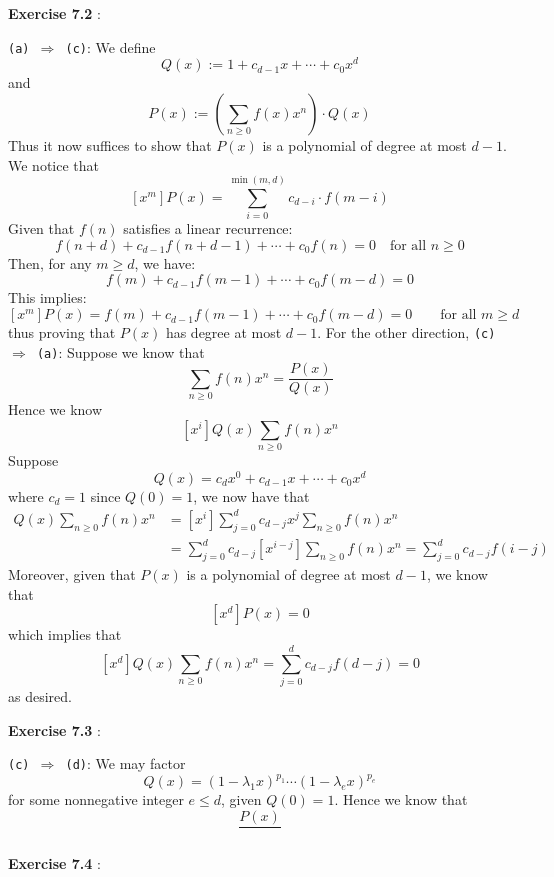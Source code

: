 \documentclass{article}
\newenvironment{solution}[1][\proofname]{
    \proof[\textbf{Solution:}] \renewcommand{\qedsymbol}{$\bell$}
}{\endproof}
\begin{document}
\newpage

\noindent \textbf{Exercise 7.2} : 

\begin{solution}
    \texttt{(a) $\Rightarrow$ (c)}: We define 
    \[ Q(x) := 1 + c_{d-1} x + \cdots + c_0 x^d \]
    and 
    \[ P(x) := \left( \sum_{n \geq 0} f(x) x^n \right) \cdot Q(x) \]
    Thus it now suffices to show that $P(x)$ is a polynomial of degree at most $d - 1$. We notice that 
    \[ [x^m] P(x) = \sum_{i = 0}^{\min(m, d)} c_{d - i} \cdot f(m - i) \]
    Given that $f(n)$ satisfies a linear recurrence:
    \[
    f(n + d) + c_{d-1} f(n + d - 1) + \cdots + c_0 f(n) = 0 \quad \text{for all } n \geq 0
    \]
    Then, for any $m \geq d$, we have:
    \[ f(m) + c_{d-1} f(m - 1) + \cdots + c_0 f(m - d) = 0 \]
    This implies:
    \[ [x^m] P(x) = f(m) + c_{d-1} f(m - 1) + \cdots + c_0 f(m - d) = 0 \qquad \text{for all } m \geq d \] 
    thus proving that $P(x)$ has degree at most $d - 1$. For the other direction, \texttt{(c) $\Rightarrow$ (a)}: Suppose we know that 
    \[ \sum_{n \geq 0} f(n) x^n = \frac{P(x)}{Q(x)} \] 
    Hence we know 
    \[ [x^i] Q(x) \sum_{n \geq 0} f(n) x^n \] 
    Suppose 
    \[ Q(x) = c_d x^0 + c_{d-1} x + \cdots + c_0 x^d \]
    where $c_d = 1$ since $Q(0) = 1$, we now have that 
    \begin{align*}
        [x^i] Q(x) \sum_{n \geq 0} f(n) x^n
        & = [x^i] \sum_{j = 0}^d c_{d-j} x^j \sum_{n \geq 0} f(n) x^n \\ 
        & = \sum_{j = 0}^d c_{d-j} [x^{i-j}] \sum_{n \geq 0} f(n) x^n = \sum_{j = 0}^d c_{d-j} f(i-j)
    \end{align*}
    Moreover, given that $P(x)$ is a polynomial of degree at most $d-1$, we know that 
    \[ [x^d] P(x) = 0 \]
    which implies that 
    \[ [x^d] Q(x) \sum_{n \geq 0} f(n) x^n = \sum_{j = 0}^d c_{d-j} f(d-j) = 0 \]
    as desired. 
\end{solution}

\newpage

\noindent \textbf{Exercise 7.3} : 

\begin{solution}
    \texttt{(c) $\Rightarrow$ (d)}: We may factor 
    \[ Q(x) = (1 - \lambda_1 x)^{p_1} \cdots (1 - \lambda_e x)^{p_e} \]
    for some nonnegative integer $e \leq d$, given $Q(0) = 1$. Hence we know that 
    \[ \frac{P(x)}{} \]
\end{solution}

\newpage

\noindent \textbf{Exercise 7.4} : 
\end{document}
